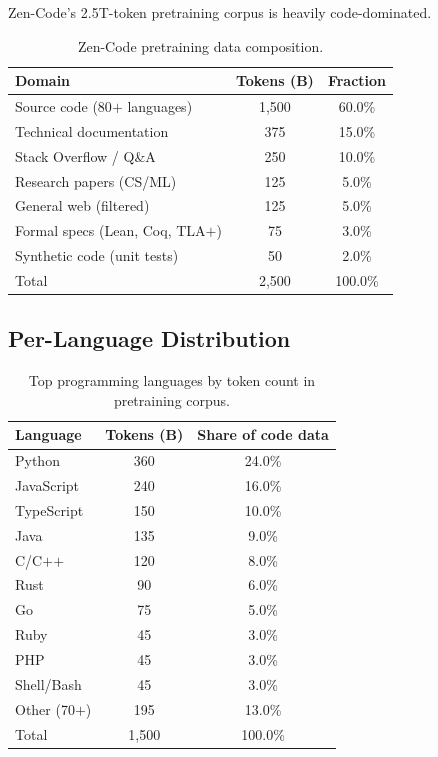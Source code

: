 \documentclass[11pt,a4paper]{article}
\begin{document}
Zen-Code's 2.5T-token pretraining corpus is heavily code-dominated.

\begin{table}[H]
\centering
\caption{Zen-Code pretraining data composition.}
\label{tab:data}
\begin{tabular}{lcc}
\toprule
\textbf{Domain} & \textbf{Tokens (B)} & \textbf{Fraction} \\
\midrule
Source code (80$+$ languages)     & 1{,}500 & 60.0\% \\
Technical documentation           &   375 & 15.0\% \\
Stack Overflow / Q\&A             &   250 & 10.0\% \\
Research papers (CS/ML)           &   125 &  5.0\% \\
General web (filtered)            &   125 &  5.0\% \\
Formal specs (Lean, Coq, TLA$+$) &    75 &  3.0\% \\
Synthetic code (unit tests)       &    50 &  2.0\% \\
\midrule
Total                             & 2{,}500 & 100.0\% \\
\bottomrule
\end{tabular}
\end{table}

\subsection{Per-Language Distribution}

\begin{table}[H]
\centering
\caption{Top programming languages by token count in pretraining corpus.}
\label{tab:langs}
\begin{tabular}{lcc}
\toprule
\textbf{Language} & \textbf{Tokens (B)} & \textbf{Share of code data} \\
\midrule
Python     & 360 & 24.0\% \\
JavaScript & 240 & 16.0\% \\
TypeScript & 150 &  10.0\% \\
Java       & 135 &  9.0\% \\
C/C$+$$+$  & 120 &  8.0\% \\
Rust       &  90 &  6.0\% \\
Go         &  75 &  5.0\% \\
Ruby       &  45 &  3.0\% \\
PHP        &  45 &  3.0\% \\
Shell/Bash &  45 &  3.0\% \\
Other (70$+$) & 195 & 13.0\% \\
\midrule
Total      & 1{,}500 & 100.0\% \\
\bottomrule
\end{tabular}
\end{table}
\end{document}
